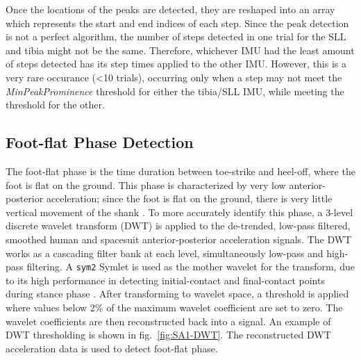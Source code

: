 \documentclass[defaultstyle,11pt]{comps}
\begin{document}
Once the locations of the peaks are detected, they are reshaped into an array which represents the start and end indices of each step.
Since the peak detection is not a perfect algorithm, the number of steps detected in one trial for the SLL and tibia might not be the same.
Therefore, whichever IMU had the least amount of steps detected has its step times applied to the other IMU.
However, this is a very rare occurance (\textless10 trials), occurring only when a step may not meet the \emph{MinPeakProminence} threshold for either the tibia/SLL IMU, while meeting the threshold for the other.

\hypertarget{foot-flat-phase-detection}{%
\subsection{Foot-flat Phase Detection}\label{foot-flat-phase-detection}}

The foot-flat phase is the time duration between toe-strike and heel-off, where the foot is flat on the ground.
This phase is characterized by very low anterior-posterior acceleration; since the foot is flat on the ground, there is very little vertical movement of the shank \citep{Rebula2013}.
To more accurately identify this phase, a 3-level discrete wavelet transform (DWT) is applied to the de-trended, low-pass filtered, smoothed human and spacesuit anterior-posterior acceleration signals.
The DWT works as a cascading filter bank at each level, simultaneously low-pass and high-pass filtering.
A \texttt{sym2} Symlet is used as the mother wavelet for the transform, due to its high performance in detecting initial-contact and final-contact points during stance phase \citep{Ji2019}.
After transforming to wavelet space, a threshold is applied where values below 2\% of the maximum wavelet coefficient are set to zero.
The wavelet coefficients are then reconstructed back into a signal. An example of DWT thresholding is shown in fig.~\ref{fig:SA1-DWT}. The reconstructed DWT acceleration data is used to detect foot-flat phase.
\end{document}
